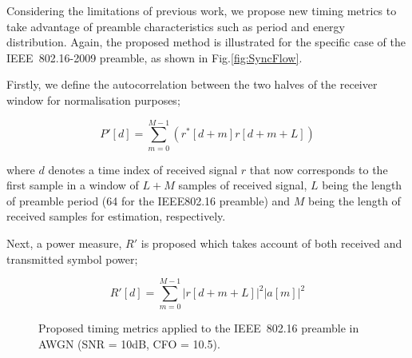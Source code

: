 Considering the limitations of previous work, we propose new timing metrics to take advantage of preamble characteristics such as period and energy distribution. 
Again, the proposed method is illustrated for the specific case of the IEEE~802.16-2009 preamble, as shown in Fig.\ref{fig:SyncFlow}.

Firstly, we define the autocorrelation between the two halves of the receiver window for normalisation purposes;

\begin{equation}
\label{ProposedP}
P'[d] =\sum_{m =0}^{M-1}    (r^{*}[d+m] r[d+m+L] )
\end{equation}

where $d$ denotes a time index of received signal $r$ that now corresponds to the first sample in a window of $L+M$ samples of received signal, $L$ being the length of preamble period (64 for the IEEE802.16 preamble) and $M$ being the length of received samples for estimation, respectively. 

Next, a power measure, $R'$ is proposed which takes account of both received and transmitted symbol power;

\begin{equation}
\label{ProposedR}
R'[d] =\sum_{m =0}^{M-1}   |r[d+m+L]|^2  |a[m]|^2
\end{equation} 


\begin{figure}
\centering
	\caption{Proposed timing metrics applied to the IEEE~802.16 preamble in AWGN (SNR = 10{\thinspace}dB, CFO = 10.5).}
	\label{fig:ProposedMetric-10dB}
\end{figure}



